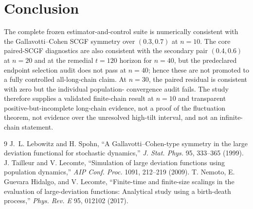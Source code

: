 \documentclass[11pt]{article}
\begin{document}
\section{Conclusion}

The complete frozen estimator-and-control suite is numerically consistent with
the Gallavotti--Cohen SCGF symmetry over $(0.3,0.7)$ at $n=10$.  The core
paired-SCGF diagnostics are also consistent with the secondary pair
$(0.4,0.6)$ at $n=20$ and at the remedial $t=120$ horizon for $n=40$, but the
predeclared endpoint selection audit does not pass at $n=40$; hence these are
not promoted to a fully controlled all-long-chain claim.  At $n=30$, the
paired residual is consistent with zero but the individual population-
convergence audit fails.  The study therefore supplies a validated finite-chain
result at $n=10$ and transparent positive-but-incomplete long-chain evidence,
not a proof of the fluctuation theorem, not evidence over the unresolved
high-tilt interval, and not an infinite-chain statement.

\begin{thebibliography}{9}
J.~L. Lebowitz and H. Spohn,
``A Gallavotti--Cohen-type symmetry in the large deviation functional for
stochastic dynamics,'' \emph{J. Stat. Phys.} 95, 333--365 (1999).
J. Tailleur and V. Lecomte,
``Simulation of large deviation functions using population dynamics,''
\emph{AIP Conf. Proc.} 1091, 212--219 (2009).
T. Nemoto, E. Guevara Hidalgo, and V. Lecomte,
``Finite-time and finite-size scalings in the evaluation of large-deviation
functions: Analytical study using a birth-death process,''
\emph{Phys. Rev. E} 95, 012102 (2017).
\end{thebibliography}
\end{document}

